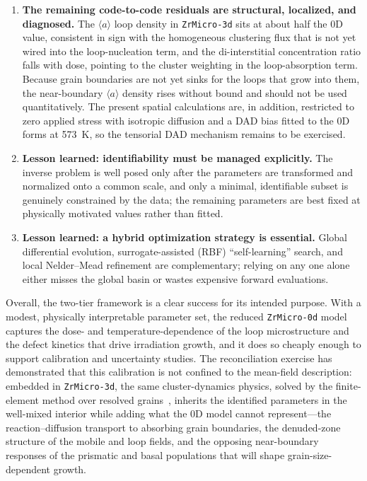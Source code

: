 \documentclass{article}
\newcommand{\aloop}{\ensuremath{\langle a\rangle}}
\newcommand{\ZrM}{\texttt{ZrMicro-3d}}
\newcommand{\ZrOd}{\texttt{ZrMicro-0d}}
\begin{document}
\begin{enumerate}
\item \textbf{The remaining code-to-code residuals are structural, localized, and diagnosed.} The \aloop{} loop density in {\ZrM} sits at about half the 0D value, consistent in sign with the homogeneous clustering flux that is not yet wired into the loop-nucleation term, and the di-interstitial concentration ratio falls with dose, pointing to the cluster weighting in the loop-absorption term. Because grain boundaries are not yet sinks for the loops that grow into them, the near-boundary \aloop{} density rises without bound and should not be used quantitatively. The present spatial calculations are, in addition, restricted to zero applied stress with isotropic diffusion and a DAD bias fitted to the 0D forms at 573~K, so the tensorial DAD mechanism remains to be exercised.
\item \textbf{Lesson learned: identifiability must be managed explicitly.} The inverse problem is well posed only after the parameters are transformed and normalized onto a common scale, and only a minimal, identifiable subset is genuinely constrained by the data; the remaining parameters are best fixed at physically motivated values rather than fitted.
\item \textbf{Lesson learned: a hybrid optimization strategy is essential.} Global differential evolution, surrogate-assisted (RBF) ``self-learning'' search, and local Nelder–Mead refinement are complementary; relying on any one alone either misses the global basin or wastes expensive forward evaluations.
\end{enumerate}

Overall, the two-tier framework is a clear success for its intended purpose. With a modest, physically interpretable parameter set, the reduced {\ZrOd} model captures the dose- and temperature-dependence of the loop microstructure and the defect kinetics that drive irradiation growth, and it does so cheaply enough to support calibration and uncertainty studies. The reconciliation exercise has demonstrated that this calibration is not confined to the mean-field description: embedded in {\ZrM}, the same cluster-dynamics physics, solved by the finite-element method over resolved grains~\citep{spatialCD2024}, inherits the identified parameters in the well-mixed interior while adding what the 0D model cannot represent---the reaction--diffusion transport to absorbing grain boundaries, the denuded-zone structure of the mobile and loop fields, and the opposing near-boundary responses of the prismatic and basal populations that will shape grain-size-dependent growth.
\end{document}
